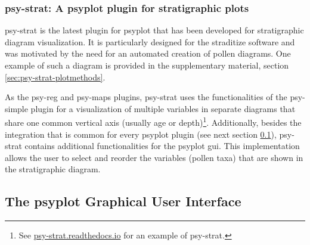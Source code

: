 \documentclass[
11pt, %
english, %
singlespacing, %
headsepline, %
]{MastersDoctoralThesis} %
\begin{document}
\begin{NoHyper}
\begin{refsection}
\subsubsection{psy-strat: A psyplot plugin for stratigraphic plots}

psy-strat \citep{Sommer2019} is the latest plugin for psyplot that has been developed for stratigraphic diagram visualization. It is particularly designed for the straditize software \citep[chapter \ref{chp:straditize}]{SommerRechChevalierEtAl2019} and was motivated by the need for an automated creation of pollen diagrams. One example of such a diagram is provided in the supplementary material, section \ref{sec:psy-strat-plotmethods}.

As the psy-reg and psy-maps plugins, psy-strat uses the functionalities of the psy-simple plugin for a visualization of multiple variables in separate diagrams that share one common vertical axis (usually age or depth)\footnote{See \href{https://psy-strat.readthedocs.io}{psy-strat.readthedocs.io} for an example of psy-strat.}. Additionally, besides the integration that is common for every psyplot plugin (see next section \ref{sec:psyplot-gui}), psy-strat contains additional functionalities for the psyplot \gls{gui}. This implementation allows the user to select and reorder the variables (pollen taxa) that are shown in the stratigraphic diagram.


\subsection{The psyplot Graphical User Interface}  \label{sec:psyplot-gui}


\end{refsection}
\end{NoHyper}
\end{document}
